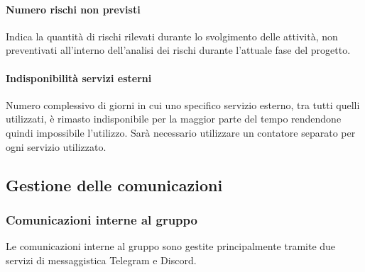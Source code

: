\paragraph{Numero rischi non previsti}\Spazio
Indica la quantità di rischi rilevati durante lo svolgimento delle attività, non preventivati all'interno dell'analisi dei rischi durante l'attuale fase del progetto.
\paragraph{Indisponibilità servizi esterni} \Spazio
Numero complessivo di giorni in cui uno specifico servizio esterno, tra tutti quelli utilizzati, è rimasto indisponibile per la maggior parte del tempo rendendone quindi impossibile l'utilizzo. Sarà necessario utilizzare un contatore separato per ogni servizio utilizzato.



\subsection{Gestione delle comunicazioni}
\subsubsection{Comunicazioni interne al gruppo}
Le comunicazioni interne al gruppo sono gestite principalmente tramite due servizi di messaggistica Telegram e Discord.
